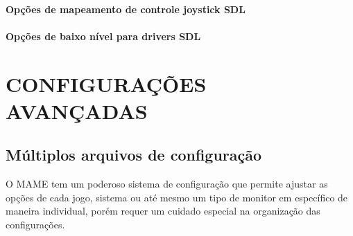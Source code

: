 \documentclass[letterpaper,10pt,brazil]{sphinxmanual}
\begin{document}
\subsubsection{Opções de mapeamento de controle joystick SDL}
\label{commandline/commandline-index:opcoes-de-mapeamento-de-controle-joystick-sdl}
\begin{DUlineblock}{0em}
\item[] {\hyperref[commandline/sdlconfig:mame\string-scommandline\string-joyidx]{}}
\item[] {\hyperref[commandline/sdlconfig:mame\string-scommandline\string-sixaxis]{}}
\end{DUlineblock}


\subsubsection{Opções de baixo nível para drivers SDL}
\label{commandline/commandline-index:opcoes-de-baixo-nivel-para-drivers-sdl}
\begin{DUlineblock}{0em}
\item[] {\hyperref[commandline/sdlconfig:mame\string-scommandline\string-videodriver]{}}
\item[] {\hyperref[commandline/sdlconfig:mame\string-scommandline\string-audiodriver]{}}
\item[] {\hyperref[commandline/sdlconfig:mame\string-scommandline\string-gllib]{}}
\end{DUlineblock}


\chapter{CONFIGURAÇÕES AVANÇADAS}
\label{advanced/index:configuracoes-avancadas}\label{advanced/index::doc}

\section{Múltiplos arquivos de configuração}
\label{advanced/multiconfig::doc}\label{advanced/multiconfig:multiplos-arquivos-de-configuracao}
O MAME tem um poderoso sistema de configuração que permite ajustar as
opções de cada jogo, sistema ou até mesmo um tipo de monitor em
específico de maneira individual, porém requer um cuidado especial na
organização das configurações.
\end{document}
